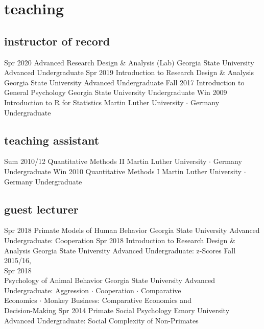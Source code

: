 \documentclass[]{friggeri-cv}
\begin{document}

\section{teaching}

\subsection{instructor of record}

\begin{entrylist}
  \entry
    {Spr 2020}
    {Advanced Research Design \& Analysis (Lab)}
    {Georgia State University}
    {Advanced Undergraduate}
  \entry
    {Spr 2019}
    {Introduction to Research Design \& Analysis}
    {Georgia State University}
    {Advanced Undergraduate}
  \entry
    {Fall 2017}
    {Introduction to General Psychology}
    {Georgia State University}
    {Undergraduate}
  \entry
    {Win 2009}
    {Introduction to R for Statistics}
    {Martin Luther University $\cdot$ Germany}
    {Undergraduate}
\end{entrylist}

\subsection{teaching assistant}

\begin{entrylist}
  \entry
    {Sum 2010/12}
    {Quantitative Methods II}
    {Martin Luther University $\cdot$ Germany}
    {Undergraduate}
  \entry
    {Win 2010}
    {Quantitative Methods I}
    {Martin Luther University $\cdot$ Germany}
    {Undergraduate}
\end{entrylist}

\subsection{guest lecturer}

\begin{entrylist}
  \entry
    {Spr 2018}
    {Primate Models of Human Behavior}
    {Georgia State University}
    {Advanced Undergraduate: Cooperation}
  \entry
    {Spr 2018}
    {Introduction to Research Design \& Analysis}
    {Georgia State University}
    {Advanced Undergraduate: z-Scores}
  \entry
    {Fall 2015/16,\\Spr 2018\\[-.85cm]}
    {Psychology of Animal Behavior}
    {Georgia State University}
    {Advanced Undergraduate: Aggression $\cdot$ Cooperation $\cdot$ Comparative \\
    Economics $\cdot$ Monkey Business: Comparative Economics and \\
    Decision-Making}
  \entry
    {Spr 2014}
    {Primate Social Psychology}
    {Emory University}
    {Advanced Undergraduate: Social Complexity of Non-Primates}
\end{entrylist}
\end{document}
